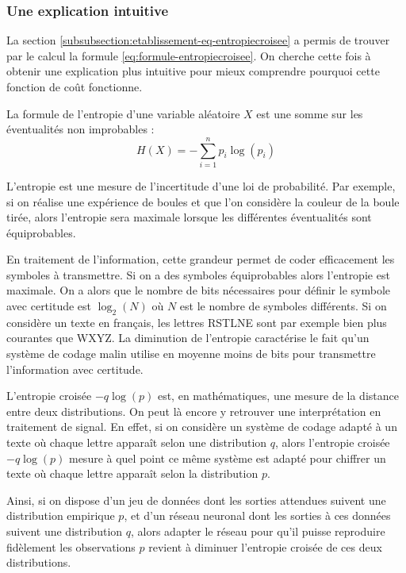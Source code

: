 \subsubsection{Une explication intuitive}

La section \ref{subsubsection:etablissement-eq-entropiecroisee} a permis de trouver par le calcul la formule \ref{eq:formule-entropiecroisee}.
On cherche cette fois à obtenir une explication plus intuitive pour mieux comprendre pourquoi cette fonction de coût fonctionne.

La formule de l'entropie d'une variable aléatoire $X$ est une somme sur les éventualités non improbables :
\begin{equation}
 H(X) = -\sum_{i=1}^{n} p_i\log\left(p_i\right)
\end{equation}

L'entropie est une mesure de l'incertitude d'une loi de probabilité. Par exemple, si on réalise une expérience de boules et que l'on considère
la couleur de la boule tirée, alors l'entropie sera maximale lorsque les différentes éventualités sont équiprobables.

En traitement de l'information, cette grandeur permet de coder efficacement les symboles à transmettre. Si on a des symboles équiprobables alors
l'entropie est maximale. On a alors que le nombre de bits nécessaires pour définir le symbole avec certitude est $\log_2\left(N\right)$ où $N$ est le nombre
de symboles différents. Si on considère un texte en français, les lettres RSTLNE sont par exemple bien plus courantes que WXYZ. La diminution de l'entropie
caractérise le fait qu'un système de codage malin utilise en moyenne moins de bits pour transmettre l'information avec certitude.

L'entropie croisée $-q\log\left(p\right)$ est, en mathématiques, une mesure de la distance entre deux distributions. On peut là encore y retrouver une interprétation
en traitement de signal. En effet, si on considère un système de codage adapté à un texte où chaque lettre apparaît selon une distribution $q$, alors
l'entropie croisée $-q\log\left(p\right)$ mesure à quel point ce même système est adapté pour chiffrer un texte où chaque lettre apparaît selon la distribution $p$.

Ainsi, si on dispose d'un jeu de données dont les sorties attendues suivent une distribution empirique $p$, et d'un réseau neuronal dont les sorties
à ces données suivent une distribution $q$, alors adapter le réseau pour qu'il puisse reproduire fidèlement les observations $p$ revient 
à diminuer l'entropie croisée de ces deux distributions.

